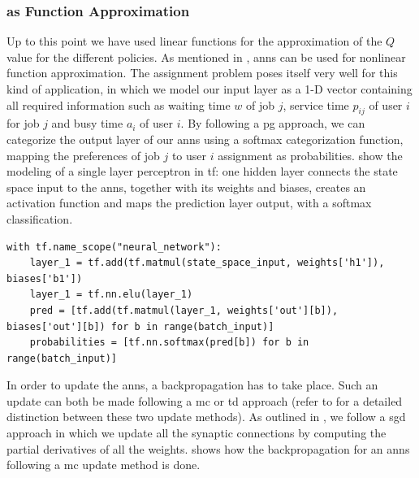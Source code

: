 \subsubsection{ as Function Approximation}

Up to this point we have used linear functions for the approximation of the $Q$ value for the different policies. As mentioned in , \glspl{ann} can be used for nonlinear function approximation. The assignment problem  poses itself very well for this kind of application, in which we model our input layer as a 1-D vector containing all required information such as waiting time $w$ of job $j$, service time $p_{ij}$ of user $i$ for job $j$ and busy time $a_i$ of user $i$. By following a \gls{pg} approach, we can categorize the output layer of our \glspl{ann} using a softmax categorization function, mapping the preferences of job $j$ to user $i$ assignment as probabilities.  show the modeling of a single layer perceptron in \gls{tf}: one hidden layer connects the state space \ie input to the \glspl{ann}, together with its weights and biases, creates an activation function and maps the prediction layer \ie output, with a softmax classification.

\begin{lstlisting}[caption=Modeling of a single perceptron in \glsentryshort{tf},label=lst:ann_1h,style=CustomPython]
with tf.name_scope("neural_network"):
	layer_1 = tf.add(tf.matmul(state_space_input, weights['h1']), biases['b1'])
	layer_1 = tf.nn.elu(layer_1)
	pred = [tf.add(tf.matmul(layer_1, weights['out'][b]), biases['out'][b]) for b in range(batch_input)]
	probabilities = [tf.nn.softmax(pred[b]) for b in range(batch_input)]
\end{lstlisting}

In order to update the \glspl{ann}, a backpropagation has to take place. Such an update can both be made following a \gls{mc} or \gls{td} approach (refer to  for a detailed distinction between these two update methods). As outlined in , we follow a \gls{sgd} approach in which we update all the synaptic connections by computing the partial derivatives of all the weights.  shows how the backpropagation for an \glspl{ann} following a \gls{mc} update method is done.

